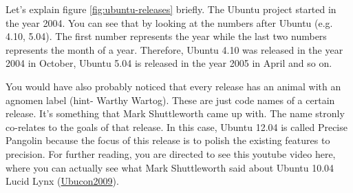 \par \noindent Let's explain figure \ref{fig:ubuntu-releases} briefly. The Ubuntu project started in the year 2004. You can see that by looking at the numbers after Ubuntu (e.g. 4.10, 5.04). The first number represents the year while the last two numbers represents the month of a year. Therefore, Ubuntu 4.10 was released in the year 2004 in October, Ubuntu 5.04 is released in the year 2005 in April and so on. \\

\par \noindent You would have also probably noticed that every release has an animal with an agnomen label (hint- Warthy Wartog). These are just code names of a certain release. It's something that Mark Shuttleworth came up with. The name stronly co-relates to the goals of that release. In this case, Ubuntu 12.04 is called Precise Pangolin because the focus of this release is to polish the existing features to precision. For further reading, you are directed to see this youtube video here, where you can actually see what Mark Shuttleworth said about Ubuntu 10.04 Lucid Lynx (\href{http://www.youtube.com/watch?v=l02bhwofEqw}{Ubucon2009}). \\




